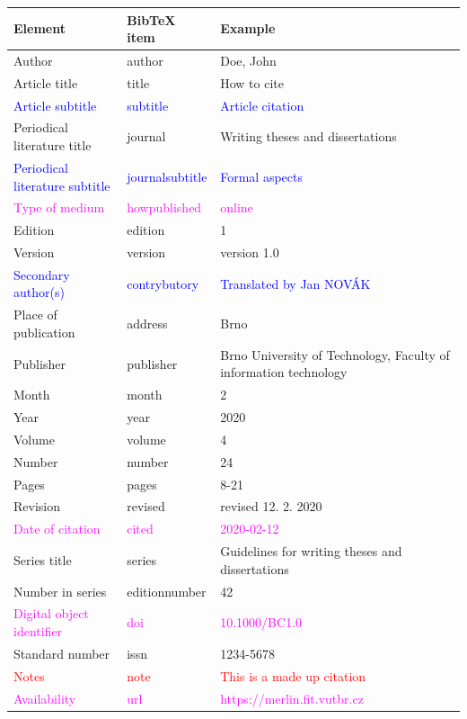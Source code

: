 \begin{tabularx}{\linewidth}{X X X}
    Element & BibTeX item & Example\\\hline
    Author & author & Doe, John\\
    Article title & title & How to cite\\
    \textcolor{blue}{Article subtitle} & \textcolor{blue}{subtitle} & \textcolor{blue}{Article citation}\\
    Periodical literature title & journal & Writing theses and dissertations\\
    \textcolor{blue}{Periodical literature subtitle} & \textcolor{blue}{journalsubtitle} & \textcolor{blue}{Formal aspects}\\
    \textcolor{magenta}{Type of medium} & \textcolor{magenta}{howpublished} & \textcolor{magenta}{online}\\
    Edition & edition & 1\\
    Version & version & version 1.0\\
    \textcolor{blue}{Secondary author(s)} & \textcolor{blue}{contrybutory} & \textcolor{blue}{Translated by Jan NOVÁK}\\
    Place of publication & address & Brno\\
    Publisher & publisher & Brno University of Technology, Faculty of information technology\\
    Month & month & 2\\
    Year & year & 2020\\
    Volume & volume & 4\\
    Number & number & 24\\
    Pages & pages & 8-21\\
    Revision & revised & revised 12. 2. 2020\\
    \textcolor{magenta}{Date of citation} & \textcolor{magenta}{cited} & \textcolor{magenta}{2020-02-12}\\
    Series title & series & Guidelines for writing theses and dissertations\\
    Number in series & editionnumber & 42\\
    \textcolor{magenta}{Digital object identifier} & \textcolor{magenta}{doi} & \textcolor{magenta}{10.1000/BC1.0}\\
    Standard number & issn & 1234-5678\\
    \textcolor{red}{Notes} & \textcolor{red}{note} & \textcolor{red}{This is a made up citation}\\
    \textcolor{magenta}{Availability} & \textcolor{magenta}{url} & \textcolor{magenta}{https://merlin.fit.vutbr.cz}
\end{tabularx}

